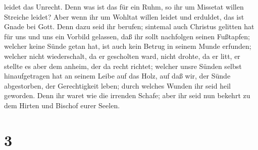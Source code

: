 leidet das Unrecht.  Denn was ist das für ein Ruhm, so ihr
um Missetat willen Streiche leidet? Aber wenn ihr um Wohltat willen
leidet und erduldet, das ist Gnade bei Gott.  Denn dazu
seid ihr berufen; sintemal auch Christus gelitten hat für uns und uns
ein Vorbild gelassen, daß ihr sollt nachfolgen seinen Fußtapfen;
 welcher keine Sünde getan hat, ist auch kein Betrug in
seinem Munde erfunden;  welcher nicht wiederschalt, da er
gescholten ward, nicht drohte, da er litt, er stellte es aber dem
anheim, der da recht richtet;  welcher unsre Sünden selbst
hinaufgetragen hat an seinem Leibe auf das Holz, auf daß wir, der Sünde
abgestorben, der Gerechtigkeit leben; durch welches Wunden ihr seid heil
geworden.  Denn ihr waret wie die irrenden Schafe; aber ihr
seid nun bekehrt zu dem Hirten und Bischof eurer Seelen.

\hypertarget{section-2}{%
\section{3}\label{section-2}}

